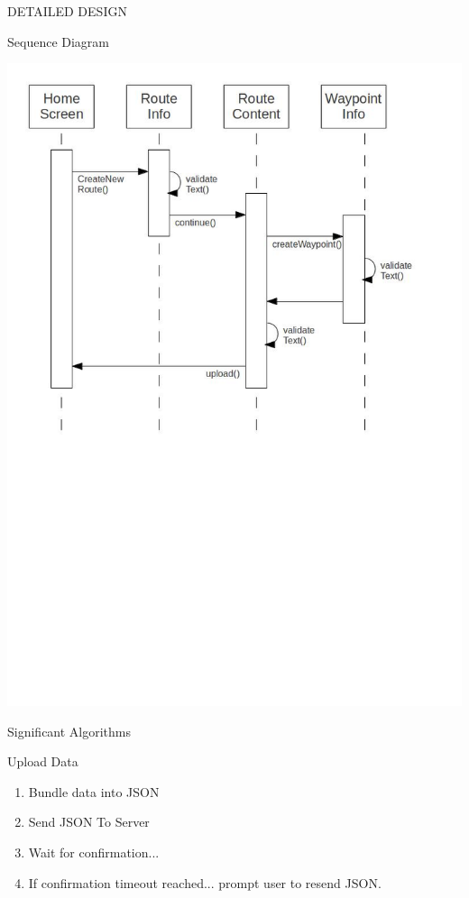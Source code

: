 \documentclass{article}
\begin{document}
\clearpage
\begin{section}{DETAILED DESIGN}
	\begin{subsection}{Sequence Diagram}
		\begin{center}
			\includegraphics[width=0.9\columnwidth]{../SequenceDiagram/DetailedDesign5-1.jpg}
		\end{center}
	\end{subsection}
	
	\begin{subsection}{Significant Algorithms}
		\begin{subsubsection}{Upload Data}
		    \begin{enumerate}
		        \item{Bundle data into JSON}
		        \item{Send JSON To Server}
		        \item{Wait for confirmation...}
		        \item{If confirmation timeout reached... prompt user to resend JSON.}
		    \end{enumerate}
		\end{subsubsection}
		

\end{subsection}
\end{section}
\end{document}
